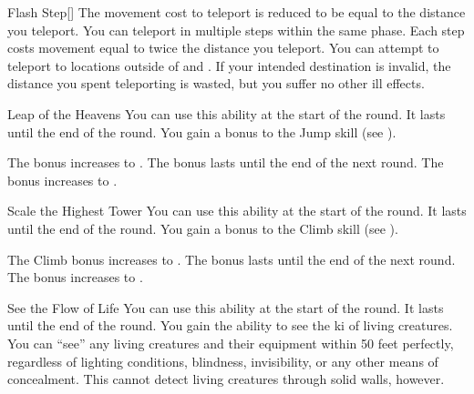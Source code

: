 {\begin{apability}{Flash Step}[]
                \rankline
                 The movement cost to teleport is reduced to be equal to the distance you teleport.
                 You can teleport in multiple steps within the same phase.
                Each step costs movement equal to twice the distance you teleport.
                 You can attempt to teleport to locations outside of  and .
                If your intended destination is invalid, the distance you spent teleporting is wasted, but you suffer no other ill effects.
            \end{apability}

            \begin{apability}{Leap of the Heavens}
                You can use this ability at the start of the round.
                It lasts until the end of the round.
                You gain a  bonus to the Jump skill (see ).

                \rankline
                 The bonus increases to .
                 The bonus lasts until the end of the next round.
                 The bonus increases to .
            \end{apability}

            \begin{apability}{Scale the Highest Tower}
                You can use this ability at the start of the round.
                It lasts until the end of the round.
                You gain a  bonus to the Climb skill (see ).

                \rankline
                 The Climb bonus increases to .
                 The bonus lasts until the end of the next round.
                 The bonus increases to .
            \end{apability}

            \begin{apability}{See the Flow of Life}
                You can use this ability at the start of the round.
                It lasts until the end of the round.
                You gain the ability to see the ki of living creatures.
                You can ``see'' any living creatures and their equipment within 50 feet perfectly, regardless of lighting conditions, blindness, invisibility, or any other means of concealment.
                This cannot detect living creatures through solid walls, however.


\end{apability}}
